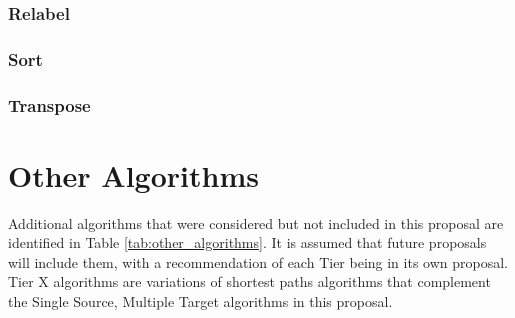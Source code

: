 \subsection{Relabel}

\subsection{Sort}

\subsection{Transpose}




\chapter{Other Algorithms}

Additional algorithms that were considered but not included in this proposal are identified in Table \ref{tab:other_algorithms}. 
It is assumed that future proposals will include them, with a recommendation of each Tier being in its own proposal.
Tier X algorithms are variations of shortest paths algorithms that complement the Single Source, Multiple Target algorithms 
in this proposal.

